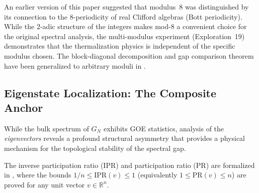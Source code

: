 \documentclass[11pt,a4paper]{article}
\begin{document}
\begin{remark}
An earlier version of this paper suggested that modulus~8 was distinguished
by its connection to the $8$-periodicity of real Clifford algebras
(Bott periodicity). While the $2$-adic structure of the integers makes
mod-8 a convenient choice for the original spectral analysis, the
multi-modulus experiment (Exploration~19) demonstrates that the
thermalization physics is independent of the specific modulus chosen.
The block-diagonal decomposition and gap comparison theorem have been
generalized to arbitrary moduli in .
\end{remark}

\subsection{Eigenstate Localization: The Composite Anchor}
\label{sec:localization}

While the bulk spectrum of $G_N$ exhibits GOE statistics, analysis of the
\emph{eigenvectors} reveals a profound structural asymmetry that provides
a physical mechanism for the topological stability of the spectral gap.

The inverse participation ratio (IPR) and participation ratio (PR) are
formalized in , where the bounds
$1/n \leq \mathrm{IPR}(v) \leq 1$ (equivalently $1 \leq \mathrm{PR}(v) \leq n$)
are proved for any unit vector $v \in \mathbb{R}^n$.
\end{document}
